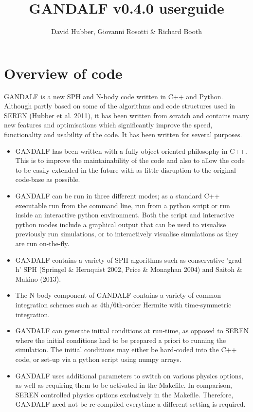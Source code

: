 \documentclass[a4paper]{article}
\newcommand{\VERNO}{0.4.0 }
\begin{document}

\title{GANDALF v\VERNO userguide}
\author{David Hubber, Giovanni Rosotti \& Richard Booth}

\maketitle
\tableofcontents

\newpage


\section{Overview of code}
GANDALF is a new SPH and N-body code written in C++ and Python.  Although partly based on some of the algorithms and code structures used in SEREN (Hubber et al. 2011), it has been written from scratch and contains many new features and optimisations which significantly improve the speed, functionality and usability of the code.  It has been written for several purposes.
\begin{itemize}
\item GANDALF has been written with a fully object-oriented philosophy in C++.  This is to improve the maintainability of the code and also to allow the code to be easily extended in the future with as little disruption to the original code-base as possible.
\item GANDALF can be run in three different modes; as a standard C++ executable run from the command line, run from a python script or run inside an interactive python environment.  Both the script and interactive python modes include a graphical output that can be used to visualise previously run simulations, or to interactively visualise simulations as they are run on-the-fly.
\item GANDALF contains a variety of SPH algorithms such as conservative 'grad-h' SPH (Springel \& Hernquist 2002, Price \& Monaghan 2004) and Saitoh \& Makino (2013).
\item The N-body component of GANDALF contains a variety of common integration schemes such as 4th/6th-order Hermite with time-symmetric integration.
\item GANDALF can generate initial conditions at run-time, as opposed to SEREN where the initial conditions had to be prepared a priori to running the simulation.  The initial conditions may either be hard-coded into the C++ code, or set-up via a python script using numpy arrays.
\item GANDALF uses additional parameters to switch on various physics options, as well as requiring them to be activated in the Makefile.  In comparison, SEREN controlled physics options exclusively in the Makefile.  Therefore, GANDALF need not be re-compiled everytime a different setting is required.
\end{itemize}
\end{document}
